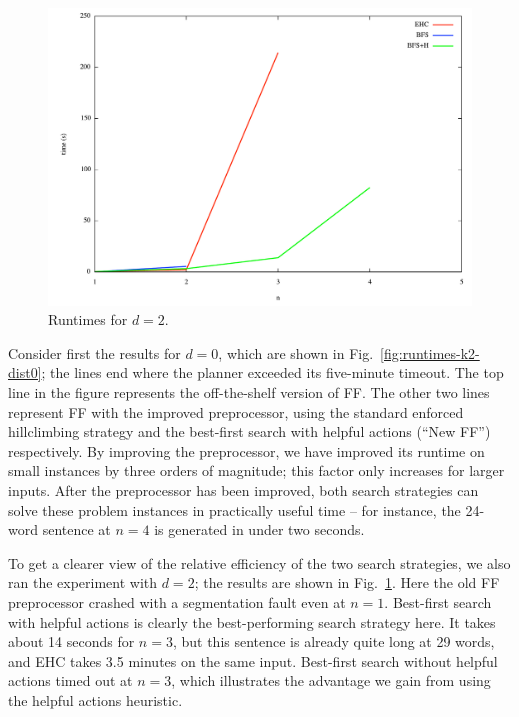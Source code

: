 \begin{figure}[t]
  \centering
  \includegraphics[width=\columnwidth]{pics/xtag-k2-dist2}
  \caption{Runtimes for $d=2$.}
  \label{fig:runtimes-k2-dist2}
\end{figure}

Consider first the results for $d=0$, which are shown in
Fig.~\ref{fig:runtimes-k2-dist0}; the lines end where the planner
exceeded its five-minute timeout.  The top line in the figure
represents the off-the-shelf version of FF. The other two lines
represent FF with the improved preprocessor, using the standard
enforced hillclimbing strategy and the best-first search with helpful
actions (``New FF'') respectively.  By improving the preprocessor, we
have improved its runtime on small instances by three orders of
magnitude; this factor only increases for larger inputs.  After the
preprocessor has been improved, both search strategies can solve these
problem instances in practically useful time -- for instance, the
24-word sentence at $n=4$ is generated in under two seconds.

To get a clearer view of the relative efficiency of the two search
strategies, we also ran the experiment with $d=2$; the results are
shown in Fig.~\ref{fig:runtimes-k2-dist2}.  Here the old FF
preprocessor crashed with a segmentation fault even at
$n=1$. Best-first search with helpful actions is clearly the
best-performing search strategy here.  It takes about 14 seconds for
$n=3$, but this sentence is already quite long at 29 words, and EHC
takes 3.5 minutes on the same input.  Best-first search without
helpful actions timed out at $n=3$, which illustrates the advantage we
gain from using the helpful actions heuristic.

